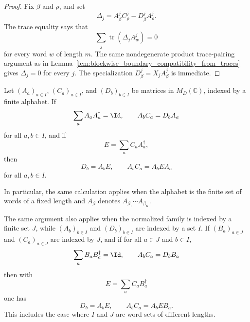 \begin{proof}
    \leanok
    Fix \(\beta\) and \(\rho\), and set
    \[
        \Delta_j=A^j_\beta C^j_\rho-D^j_\beta A^j_\rho .
    \]
    The trace equality says that
    \[
        \sum_j\operatorname{tr}(\Delta_jA^j_w)=0
    \]
    for every word \(w\) of length \(m\).  The same nondegenerate product
    trace-pairing argument as in
    Lemma~\ref{lem:blockwise_boundary_compatibility_from_traces} gives
    \(\Delta_j=0\) for every \(j\).  The specialization
    \(D^j_\beta=X_jA^j_\beta\) is immediate.
\end{proof}

\begin{lemma}
    \label{lem:normalized_boundary_matrix_identities}
    \leanok
    Let $(A_a)_{a\in I}$, $(C_a)_{a\in I}$, and $(D_b)_{b\in I}$ be matrices in
    $M_D(\mathbb C)$, indexed by a finite alphabet. If
    \[
        \sum_a A_a A_a^\dagger=\Id,
        \qquad
        A_b C_a=D_b A_a
    \]
    for all $a,b\in I$, and if
    \[
        E=\sum_a C_a A_a^\dagger,
    \]
    then
    \[
        D_b=A_bE,
        \qquad
        A_bC_a=A_bEA_a
    \]
    for all $a,b\in I$.

    In particular, the same calculation applies when the alphabet is the finite
    set of words of a fixed length and $A_\beta$ denotes
    $A_{\beta_1}\cdots A_{\beta_K}$.

    The same argument also applies when the normalized family is indexed by a
    finite set $J$, while $(A_b)_{b\in I}$ and $(D_b)_{b\in I}$ are indexed by
    a set $I$. If $(B_a)_{a\in J}$ and $(C_a)_{a\in J}$ are indexed by $J$,
    and if for all $a\in J$ and $b\in I$,
    \[
        \sum_a B_aB_a^\dagger=\Id,
        \qquad
        A_bC_a=D_bB_a
    \]
    then with
    \[
        E=\sum_a C_aB_a^\dagger
    \]
    one has
    \[
        D_b=A_bE,
        \qquad
        A_bC_a=A_bEB_a.
    \]
    This includes the case where $I$ and $J$ are word sets of different
    lengths.
\end{lemma}

